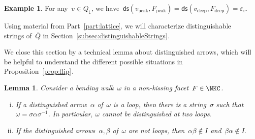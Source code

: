 \documentclass{amsart}
\newtheorem{lemma}[theorem]{Lemma}
\theoremstyle{definition}
\newtheorem{example}[theorem]{Example}
\newcommand{\distinguishedString}[2]{\mathsf{ds}(#1,#2)} %
\newcommand{\peak}{\mathrm{peak}} %
\newcommand{\deep}{\mathrm{deep}} %
\begin{document}
\begin{example}
For any~$v \in Q_1$, we have~$\distinguishedString{v_\peak}{F_\peak} = \distinguishedString{v_\deep}{F_\deep} = \varepsilon_v$.
\end{example}

Using material from Part~\ref{part:lattice}, we will characterize distinguishable strings of~$\bar Q$ in Section~\ref{subsec:distinguishableStrings}.

\medskip
We close this section by a technical lemma about distinguished arrows, which will be helpful to understand the different possible situations in Proposition~\ref{prop:flip}.

\begin{lemma}
\label{lem:weirdDistinguishedArrows}
Consider a bending walk~$\omega$ in a non-kissing facet~$F \in \NKC$.
\begin{enumerate}[(i)]
\item If a distinguished arrow~$\alpha$ of~$\omega$ is a loop, then there is a string~$\sigma$ such that~${\omega = \sigma \alpha \sigma^{-1}}$. In particular, $\omega$ cannot be distinguished at two loops.
\item If the distinguished arrows~$\alpha, \beta$ of~$\omega$ are not loops, then~$\alpha \beta \notin I$ and~$\beta \alpha \notin I$.
\end{enumerate}
\end{lemma}
\end{document}
